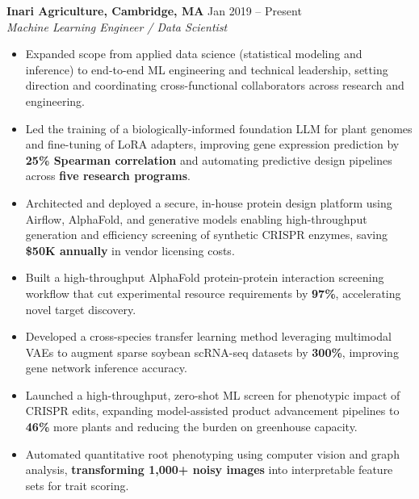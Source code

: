 \documentclass[10pt,a4paper]{article}
\begin{document}
\textbf{Inari Agriculture, Cambridge, MA} \hfill Jan 2019 – Present \\
\textit{Machine Learning Engineer / Data Scientist}
\begin{itemize}
    \fontsize{9}{11}\selectfont
    \item Expanded scope from applied data science (statistical modeling and inference) to end-to-end ML engineering and technical leadership, setting direction and coordinating cross-functional collaborators across research and engineering.
    \item Led the training of a biologically-informed foundation LLM for plant genomes and fine-tuning of LoRA adapters, improving gene expression prediction by \textbf{25\% Spearman correlation} and automating predictive design pipelines across \textbf{five research programs}.
    \item Architected and deployed a secure, in-house protein design platform using Airflow, AlphaFold, and generative models enabling high-throughput generation and efficiency screening of synthetic CRISPR enzymes, saving \textbf{\$50K annually} in vendor licensing costs.
    \item Built a high-throughput AlphaFold protein-protein interaction screening workflow that cut experimental resource requirements by \textbf{97\%}, accelerating novel target discovery.
    \item Developed a cross-species transfer learning method leveraging multimodal VAEs to augment sparse soybean scRNA-seq datasets by \textbf{300\%}, improving gene network inference accuracy.
    \item Launched a high-throughput, zero-shot ML screen for phenotypic impact of CRISPR edits, expanding model-assisted product advancement pipelines to \textbf{46\%} more plants and reducing the burden on greenhouse capacity.
    \item Automated quantitative root phenotyping using computer vision and graph analysis, \textbf{transforming 1,000+ noisy images} into interpretable feature sets for trait scoring.
\end{itemize}
\end{document}
